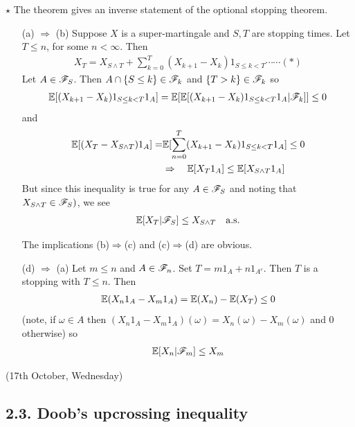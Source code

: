 \documentclass[10pt,a4paper]{report}
\newenvironment{proof}
{\begin{changemargin}{1cm}{0.5cm} 
	}%
	{\end{changemargin}
}
\begin{document}
$\star$ The theorem gives an inverse statement of the optional stopping theorem.
\s

\begin{proof}
\pf

\begin{itemize}
\item[(a) $\Rightarrow$ (b)] Suppose $X$ is a super-martingale and $S,T$ are stopping times. Let $T\leq n$, for some $n<\infty$. Then
\begin{align*}
X_T = X_{S\wedge T} + \sum_{k=0}^T (X_{k+1} - X_k) 1_{S\leq k<T} \cdots \cdots (*)
\end{align*}
Let $A \in \mathscr{F}_S$. Then $A\cap \{ S\leq k\}\in \mathscr{F}_k$ and $\{T>k\} \in \mathscr{F}_k$ so
\begin{align*}
\mathbb{E}[(X_{k+1} - X_k) 1_{S\leq k<T} 1_A] =\mathbb{E}[\mathbb{E}[(X_{k+1} - X_k) 1_{S\leq k<T} 1_A|\mathscr{F}_k]] \leq 0
\end{align*}
and
\begin{align*}
\mathbb{E}[(X_T - X_{S\wedge T}) 1_A] = & \mathbb{E}[\sum_{n=0}^T (X_{k+1} - X_k) 1_{S\leq k<T} 1_A] \leq 0 \\
& \Rightarrow \quad \mathbb{E}[ X_T 1_A] \leq \mathbb{E}[X_{S\wedge T} 1_A] \\
\end{align*}
But since this inequality is true for any $A\in \mathscr{F}_S$ and noting that $X_{S\wedge T} \in \mathscr{F}_S)$, we see
\begin{align*}
\mathbb{E}[X_T |\mathscr{F}_S] \leq X_{S\wedge T} \quad \text{a.s.}
\end{align*}
\s

The implications (b)$\Rightarrow$(c) and (c)$\Rightarrow$(d) are obvious.
\s

\item[(d) $\Rightarrow$ (a)] Let $m\leq n$ and $A\in \mathscr{F}_n$. Set $T= m1_A + n1_{A^c}$. Then $T$ is a stopping with $T\leq n$. Then
\begin{align*}
\mathbb{E}(X_n 1_A -X_m 1_A) = \mathbb{E}(X_n) - \mathbb{E}(X_T) \leq 0
\end{align*}
(note, if $\omega \in A$ then $(X_n1_A - X_m1_A)(\omega) = X_n(\omega) -X_m(\omega)$ and $0$ otherwise) so
\begin{align*}
\mathbb{E}[X_n | \mathscr{F}_m] \leq X_m
\end{align*}
\end{itemize}
\eop
\end{proof}
\s

\newday

(17th October, Wednesday)
\s

\subsection*{2.3. Doob's upcrossing inequality}
\end{document}
